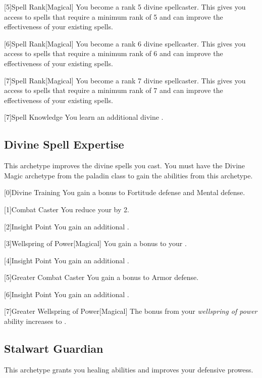         [5]{Spell Rank}[Magical] You become a rank 5 divine spellcaster.
        This gives you access to spells that require a minimum rank of 5 and can improve the effectiveness of your existing spells.

        [6]{Spell Rank}[Magical] You become a rank 6 divine spellcaster.
        This gives you access to spells that require a minimum rank of 6 and can improve the effectiveness of your existing spells.

        [7]{Spell Rank}[Magical] You become a rank 7 divine spellcaster.
        This gives you access to spells that require a minimum rank of 7 and can improve the effectiveness of your existing spells.

        [7]{Spell Knowledge} You learn an additional divine .

    \newpage
    \subsection{Divine Spell Expertise}
        This archetype improves the divine spells you cast.
        You must have the Divine Magic archetype from the paladin class to gain the abilities from this archetype.

        [0]{Divine Training} You gain a  bonus to Fortitude defense and Mental defense.

        [1]{Combat Caster} You reduce your  by 2.

        [2]{Insight Point} You gain an additional .

        [3]{Wellspring of Power}[Magical]
        You gain a  bonus to your  .

        [4]{Insight Point} You gain an additional .

        [5]{Greater Combat Caster} You gain a  bonus to Armor defense.

        [6]{Insight Point} You gain an additional .

        [7]{Greater Wellspring of Power}[Magical]
        The bonus from your \textit{wellspring of power} ability increases to .

    \newpage
    \subsection{Stalwart Guardian}
        This archetype grants you healing abilities and improves your defensive prowess.

